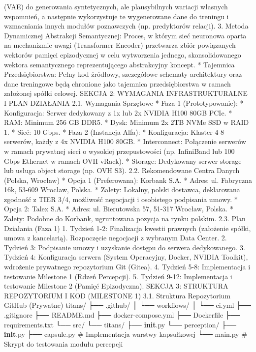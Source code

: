 \documentclass[letterpaper,twocolumn]{article}
\begin{document}
(VAE) do generowania syntetycznych, ale plausybilnych wariacji własnych
wspomnień, a następnie wykorzystuje te wygenerowane dane do treningu i
wzmacniania innych modułów poznawczych (np. predyktorów relacji). 3.
Metoda Dynamicznej Abstrakcji Semantycznej: Proces, w którym sieć
neuronowa oparta na mechanizmie uwagi (Transformer Encoder) przetwarza
zbiór powiązanych wektorów pamięci epizodycznej w celu wytworzenia
jednego, skonsolidowanego wektora semantycznego reprezentującego
abstrakcyjny koncept. * Tajemnica Przedsiębiorstwa: Pełny kod źródłowy,
szczegółowe schematy architektury oraz dane treningowe będą chronione
jako tajemnica przedsiębiorstwa w ramach założonej spółki celowej.
SEKCJA 2: WYMAGANIA INFRASTRUKTURALNE I PLAN DZIAŁANIA 2.1. Wymagania
Sprzętowe * Faza 1 (Prototypowanie): * Konfiguracja: Serwer dedykowany z
1x lub 2x NVIDIA H100 80GB PCIe. * RAM: Minimum 256 GB DDR5. * Dysk:
Minimum 2x 2TB NVMe SSD w RAID 1. * Sieć: 10 Gbps. * Faza 2 (Instancja
Alfa): * Konfiguracja: Klaster 4-8 serwerów, każdy z 4x NVIDIA H100
80GB. * Interconnect: Połączenie serwerów w ramach prywatnej sieci o
wysokiej przepustowości (np. InfiniBand lub 100 Gbps Ethernet w ramach
OVH vRack). * Storage: Dedykowany serwer storage lub usługa object
storage (np. OVH S3). 2.2. Rekomendowane Centra Danych (Polska, Wrocław)
* Opcja 1 (Preferowana): Korbank S.A. * Adres: ul. Fabryczna 16k, 53-609
Wrocław, Polska. * Zalety: Lokalny, polski dostawca, deklarowana
zgodność z TIER 3/4, możliwość negocjacji i osobistego podpisania umowy.
* Opcja 2: Talex S.A. * Adres: ul. Bierutowska 57, 51-317 Wrocław,
Polska. * Zalety: Podobne do Korbank, ugruntowana pozycja na rynku
polskim. 2.3. Plan Działania (Faza 1) 1. Tydzień 1-2: Finalizacja
kwestii prawnych (założenie spółki, umowa z kancelarią). Rozpoczęcie
negocjacji z wybranym Data Center. 2. Tydzień 3: Podpisanie umowy i
uzyskanie dostępu do serwera dedykowanego. 3. Tydzień 4: Konfiguracja
serwera (System Operacyjny, Docker, NVIDIA Toolkit), wdrożenie
prywatnego repozytorium Git (Gitea). 4. Tydzień 5-8: Implementacja i
testowanie Milestone 1 (Rdzeń Percepcji). 5. Tydzień 9-12: Implementacja
i testowanie Milestone 2 (Pamięć Epizodyczna). SEKCJA 3: STRUKTURA
REPOZYTORIUM I KOD (MILESTONE 1) 3.1. Struktura Repozytorium GitHub
(Prywatne) titans/ ├── .github/ │ └── workflows/ │ └── ci.yml ├──
.gitignore ├── README.md ├── docker-compose.yml ├── Dockerfile ├──
requirements.txt └── src/ └── titans/ ├── \textbf{init}.py └──
perception/ ├── \textbf{init}.py ├── capsule.py \# Implementacja warstwy
kapsułkowej └── main.py \# Skrypt do testowania modułu percepcji
\end{document}
